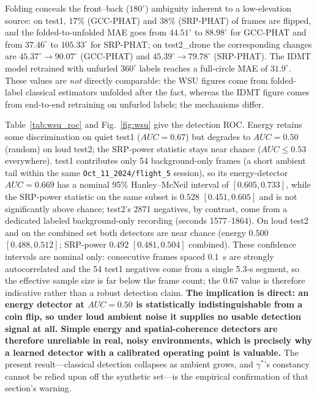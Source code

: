 \documentclass[5p,twocolumn]{elsarticle}
\begin{document}
Folding conceals the front--back ($180^\circ$) ambiguity inherent to a low-elevation source: on test1, $17\%$ (GCC-PHAT) and $38\%$ (SRP-PHAT) of frames are flipped, and the folded-to-unfolded MAE goes from $44.51^\circ$ to $88.98^\circ$ for GCC-PHAT and from $37.46^\circ$ to $105.33^\circ$ for SRP-PHAT; on test2\_drone the corresponding changes are $45.37^\circ\to90.07^\circ$ (GCC-PHAT) and $45.39^\circ\to79.78^\circ$ (SRP-PHAT). The IDMT model retrained with unfurled $360^\circ$ labels reaches a full-circle MAE of $31.9^\circ$. These values are \emph{not} directly comparable: the WSU figures come from folded-label classical estimators unfolded after the fact, whereas the IDMT figure comes from end-to-end retraining on unfurled labels; the mechanisms differ.

Table~\ref{tab:wsu_roc} and Fig.~\ref{fig:wsu} give the detection ROC. Energy retains some discrimination on quiet test1 ($AUC=0.67$) but degrades to $AUC=0.50$ (random) on loud test2; the SRP-power statistic stays near chance ($AUC\le0.53$ everywhere). test1 contributes only \num{54} background-only frames (a short ambient tail within the same \texttt{Oct\_11\_2024/flight\_5} session), so its energy-detector $AUC=0.669$ has a nominal 95\% Hanley--McNeil interval of $[0.605,0.733]$, while the SRP-power statistic on the same subset is $0.528$ $[0.451,0.605]$ and is not significantly above chance; test2's \num{2871} negatives, by contrast, come from a dedicated labeled background-only recording (seconds 1577--1864). On loud test2 and on the combined set both detectors are near chance (energy $0.500$ $[0.488,0.512]$; SRP-power $0.492$ $[0.481,0.504]$ combined). These confidence intervals are nominal only: consecutive frames spaced \SI{0.1}{\s} are strongly autocorrelated and the \num{54} test1 negatives come from a single 5.3-s segment, so the effective sample size is far below the frame count; the $0.67$ value is therefore indicative rather than a robust detection claim. \textbf{The implication is direct: an energy detector at $AUC=0.50$ is statistically indistinguishable from a coin flip, so under loud ambient noise it supplies no usable detection signal at all. Simple energy and spatial-coherence detectors are therefore unreliable in real, noisy environments, which is precisely why a learned detector with a calibrated operating point is valuable.} The present result---classical detection collapses as ambient grows, and $\gamma^*$'s constancy cannot be relied upon off the synthetic set---is the empirical confirmation of that section's warning.
\end{document}
